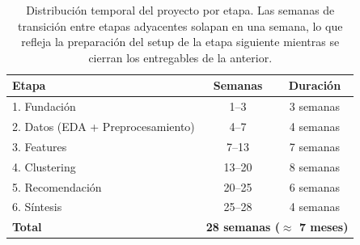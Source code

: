 \begin{table}[htbp]
\centering
\caption{Distribución temporal del proyecto por etapa. Las semanas de transición entre etapas adyacentes solapan en una semana, lo que refleja la preparación del setup de la etapa siguiente mientras se cierran los entregables de la anterior.}
\label{tab:cronograma}
\begin{tabular}{lcc}
\toprule
\textbf{Etapa} & \textbf{Semanas} & \textbf{Duración} \\
\midrule
1. Fundación                 & 1--3   & 3 semanas \\
2. Datos (EDA + Preprocesamiento) & 4--7   & 4 semanas \\
3. Features                  & 7--13  & 7 semanas \\
4. Clustering                & 13--20 & 8 semanas \\
5. Recomendación             & 20--25 & 6 semanas \\
6. Síntesis                  & 25--28 & 4 semanas \\
\midrule
\textbf{Total} & \multicolumn{2}{c}{\textbf{28 semanas (\(\approx\) 7 meses)}} \\
\bottomrule
\end{tabular}
\end{table}


